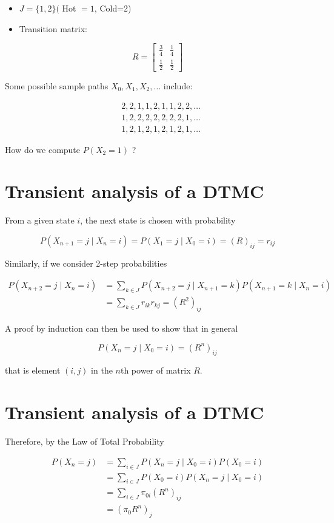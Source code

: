 \documentclass[10pt]{article}
\begin{document}
\begin{itemize}
  \item $J=\{1,2\}($ Hot $=1$, Cold=2)
  \item Transition matrix:
\end{itemize}

$$
R=\left[\begin{array}{ll}
\frac{3}{4} & \frac{1}{4} \\
\frac{1}{2} & \frac{1}{2}
\end{array}\right]
$$

Some possible sample paths $X_{0}, X_{1}, X_{2}, \ldots$ include:

$$
\begin{aligned}
& 2,2,1,1,2,1,1,2,2, \ldots \\
& 1,2,2,2,2,2,2,2,1, \ldots \\
& 1,2,1,2,1,2,1,2,1, \ldots
\end{aligned}
$$

How do we compute $P\left(X_{2}=1\right)$ ?

\section*{Transient analysis of a DTMC}
From a given state $i$, the next state is chosen with probability

$$
P\left(X_{n+1}=j \mid X_{n}=i\right)=P\left(X_{1}=j \mid X_{0}=i\right)=(R)_{i j}=r_{i j}
$$

Similarly, if we consider 2-step probabilities

$$
\begin{aligned}
P\left(X_{n+2}=j \mid X_{n}=i\right) & =\sum_{k \in J} P\left(X_{n+2}=j \mid X_{n+1}=k\right) P\left(X_{n+1}=k \mid X_{n}=i\right) \\
& =\sum_{k \in J} r_{i k} r_{k j}=\left(R^{2}\right)_{i j}
\end{aligned}
$$

A proof by induction can then be used to show that in general

$$
P\left(X_{n}=j \mid X_{0}=i\right)=\left(R^{n}\right)_{i j}
$$

that is element $(i, j)$ in the $n$th power of matrix $R$.

\section*{Transient analysis of a DTMC}
Therefore, by the Law of Total Probability

$$
\begin{aligned}
P\left(X_{n}=j\right) & =\sum_{i \in J} P\left(X_{n}=j \mid X_{0}=i\right) P\left(X_{0}=i\right) \\
& =\sum_{i \in J} P\left(X_{0}=i\right) P\left(X_{n}=j \mid X_{0}=i\right) \\
& =\sum_{i \in J} \pi_{0 i}\left(R^{n}\right)_{i j} \\
& =\left(\pi_{0} R^{n}\right)_{j}
\end{aligned}
$$
\end{document}
